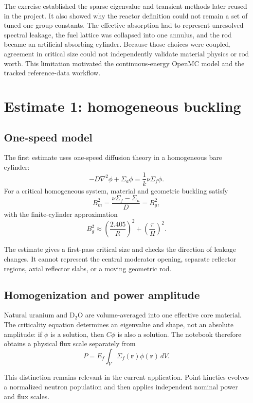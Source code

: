 \documentclass[11pt]{article}
\begin{document}
The exercise established the sparse eigenvalue and transient methods later
reused in the project.  It also showed why the reactor definition could not
remain a set of tuned one-group constants.  The effective absorption had to
represent unresolved spectral leakage, the fuel lattice was collapsed into one
annulus, and the rod became an artificial absorbing cylinder.  Because those
choices were coupled, agreement in critical size could not independently
validate material physics or rod worth.  This limitation motivated the
continuous-energy OpenMC model and the tracked reference-data workflow.

\section{Estimate 1: homogeneous buckling}

\subsection{One-speed model}

The first estimate uses one-speed diffusion theory in a homogeneous bare
cylinder:
\[
-D\nabla^2\phi+\Sigma_a\phi
=\frac{1}{k}\nu\Sigma_f\phi.
\]
For a critical homogeneous system, material and geometric buckling satisfy
\[
B_m^2=\frac{\nu\Sigma_f-\Sigma_a}{D}=B_g^2,
\]
with the finite-cylinder approximation
\[
B_g^2\approx
\left(\frac{2.405}{R}\right)^2+\left(\frac{\pi}{H}\right)^2.
\]

The estimate gives a first-pass critical size and checks the direction of
leakage changes.  It cannot represent the central moderator opening, separate
reflector regions, axial reflector slabs, or a moving geometric rod.

\subsection{Homogenization and power amplitude}

Natural uranium and D$_2$O are volume-averaged into one effective core
material.  The criticality equation determines an eigenvalue and shape, not an
absolute amplitude: if $\phi$ is a solution, then $C\phi$ is also a solution.
The notebook therefore obtains a physical flux scale separately from
\[
P=E_f\int_V\Sigma_f(\mathbf r)\phi(\mathbf r)\,dV.
\]

This distinction remains relevant in the current application.  Point kinetics
evolves a normalized neutron population and then applies independent nominal
power and flux scales.
\end{document}

